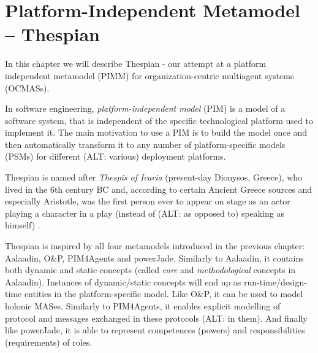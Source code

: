 
\chapter{Platform-Independent Metamodel -- Thespian}

In this chapter we will describe Thespian - our attempt at a platform independent metamodel (PIMM) for organization-centric multiagent systems (OCMASs).

In software engineering, \textit{platform-independent model} (PIM) is a model of a software system, that is independent of the specific technological platform used to implement it.
The main motivation to use a PIM is to build the model once and then automatically transform it to any number of platform-specific models (PSMs) for different (ALT: various) deployment platforms.

Thespian is named after \textit{Thespis of Icaria} (present-day Dionysos, Greece), who lived in the 6th century BC and, according to certain Ancient Greece sources and especially Aristotle, was the first person ever to appear on stage as an actor playing a character in a play (instead of (ALT: as opposed to) speaking as himself) \cite{Wikipedia-Thespis}.

Thespian is inspired by all four metamodels introduced in the previous chapter: Aalaadin, O\&P, PIM4Agents and powerJade.
Similarly to Aalaadin, it contains both dynamic and static concepts (called \textit{core} and \textit{methodological} concepts in Aalaadin). Instances of dynamic/static concepts will end up as run-time/design-time entities in the platform-specific model.
Like O\&P, it can be used to model holonic MASes.
Similarly to PIM4Agents, it enables explicit modelling of protocol and messages exchanged in these protocols (ALT: in them). 
And finally like powerJade, it is able to represent competences (powers) and responsibilities (requirements) of roles.

